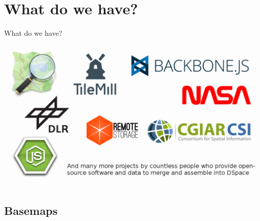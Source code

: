 \documentclass{beamer}
\begin{document}
\section{What do we have?}

\begin{frame}{What do we have?}
 \begin{center}
  \vspace{0.8em}
  \includegraphics[scale=0.281]{images/logos}
 \end{center}
\end{frame}


\subsection{Basemaps}
\end{document}
